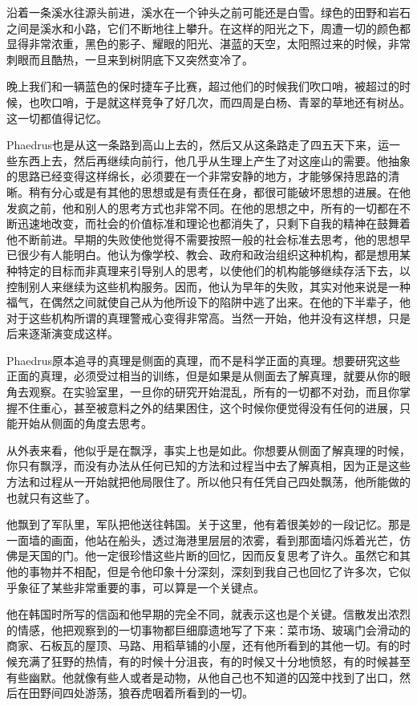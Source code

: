 \documentclass[UTF8]{article}
\begin{document}
\par 沿着一条溪水往源头前进，溪水在一个钟头之前可能还是白雪。绿色的田野和岩石之间是溪水和小路，它们不断地往上攀升。在这样的阳光之下，周遭一切的颜色都显得非常浓重，黑色的影子、耀眼的阳光、湛蓝的天空，太阳照过来的时候，非常刺眼而且酷热，一旦来到树阴底下又突然变冷了。
\par 晚上我们和一辆蓝色的保时捷车子比赛，超过他们的时候我们吹口哨，被超过的时候，也吹口哨，于是就这样竞争了好几次，而四周是白杨、青翠的草地还有树丛。这一切都值得记忆。
\par Phaedrus也是从这一条路到高山上去的，然后又从这条路走了四五天下来，运一些东西上去，然后再继续向前行，他几乎从生理上产生了对这座山的需要。他抽象的思路已经变得这样绵长，必须要在一个非常安静的地方，才能够保持思路的清晰。稍有分心或是有其他的思想或是有责任在身，都很可能破坏思想的进展。在他发疯之前，他和别人的思考方式也非常不同。在他的思想之中，所有的一切都在不断迅速地改变，而社会的价值标准和理论也都消失了，只剩下自我的精神在鼓舞着他不断前进。早期的失败使他觉得不需要按照一般的社会标准去思考，他的思想早已很少有人能明白。他认为像学校、教会、政府和政治组织这种机构，都是想用某种特定的目标而非真理来引导别人的思考，以使他们的机构能够继续存活下去，以控制别人来继续为这些机构服务。因而，他认为早年的失败，其实对他来说是一种福气，在偶然之间就使自己从为他所设下的陷阱中逃了出来。在他的下半辈子，他对于这些机构所谓的真理警戒心变得非常高。当然一开始，他并没有这样想，只是后来逐渐演变成这样。
\par Phaedrus原本追寻的真理是侧面的真理，而不是科学正面的真理。想要研究这些正面的真理，必须受过相当的训练，但是如果是从侧面去了解真理，就要从你的眼角去观察。在实验室里，一旦你的研究开始混乱，所有的一切都不对劲，而且你掌握不住重心，甚至被意料之外的结果困住，这个时候你便觉得没有任何的进展，只能开始从侧面的角度去思考。
\par 从外表来看，他似乎是在飘浮，事实上也是如此。你想要从侧面了解真理的时候，你只有飘浮，而没有办法从任何已知的方法和过程当中去了解真相，因为正是这些方法和过程从一开始就把他局限住了。所以他只有任凭自己四处飘荡，他所能做的也就只有这些了。
\par 他飘到了军队里，军队把他送往韩国。关于这里，他有着很美妙的一段记忆。那是一面墙的画面，他站在船头，透过海港里层层的浓雾，看到那面墙闪烁着光芒，仿佛是天国的门。他一定很珍惜这些片断的回忆，因而反复思考了许久。虽然它和其他的事物并不相配，但是令他印象十分深刻，深刻到我自己也回忆了许多次，它似乎象征了某些非常重要的事，可以算是一个关键点。
\par 他在韩国时所写的信函和他早期的完全不同，就表示这也是个关键。信散发出浓烈的情感，他把观察到的一切事物都巨细靡遗地写了下来：菜市场、玻璃门会滑动的商家、石板瓦的屋顶、马路、用稻草铺的小屋，还有他所看到的其他一切。有的时候充满了狂野的热情，有的时候十分沮丧，有的时候又十分地愤怒，有的时候甚至有些幽默。他就像有些人或者是动物，从他自己也不知道的囚笼中找到了出口，然后在田野间四处游荡，狼吞虎咽着所看到的一切。
\end{document}

